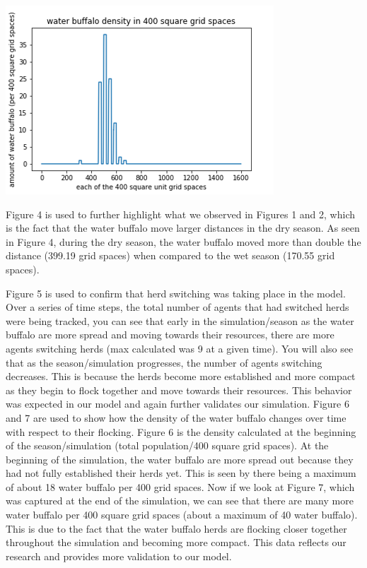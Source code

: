 \documentclass[12pt]{article}
\begin{document}
\begin{center}
\includegraphics[scale=.6]{figure7.png}%
\label{labelname}%
\end{center}

Figure 4 is used to further highlight what we observed in Figures 1 and 2, which is the fact that the water buffalo move larger distances in the dry season. As seen in Figure 4, during the dry season, the water buffalo moved more than double the distance (399.19 grid spaces) when compared to the wet season (170.55 grid spaces).

Figure 5 is used to confirm that herd switching was taking place in the model. Over a series of time steps, the total number of agents that had switched herds were being tracked, you can see that early in the simulation/season as the water buffalo are more spread and moving towards their resources, there are more agents switching herds (max calculated was 9 at a given time). You will also see that as the season/simulation progresses, the number of agents switching decreases. This is because the herds become more established and more compact as they begin to flock together and move towards their resources. This behavior was expected in our model and again further validates our simulation.
Figure 6 and 7 are used to show how the density of the water buffalo changes over time with respect to their flocking. Figure 6 is the density calculated at the beginning of the season/simulation (total population/400 square grid spaces). At the beginning of the simulation, the water buffalo are more spread out because they had not fully established their herds yet. This is seen by there being a maximum of about 18 water buffalo per 400 grid spaces. Now if we look at Figure 7, which was captured at the end of the simulation, we can see that there are many more water buffalo per 400 square grid spaces (about a maximum of 40 water buffalo). This is due to the fact that the water buffalo herds are flocking closer together throughout the simulation and becoming more compact. This data reflects our research and provides more validation to our model.
\end{document}
